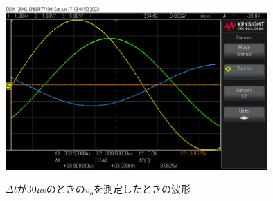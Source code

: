 \documentclass[a4j,10pt,dvipdfmx]{jarticle}
\begin{document}
\begin{figure}[H]
  \begin{center}
  \includegraphics[height=7cm,width=10cm]{30_V2out.png}
  \caption{$\Delta t$が30$\mu$sのときの$v_o$を測定したときの波形}
\end{center}
\end{figure}
\end{document}
